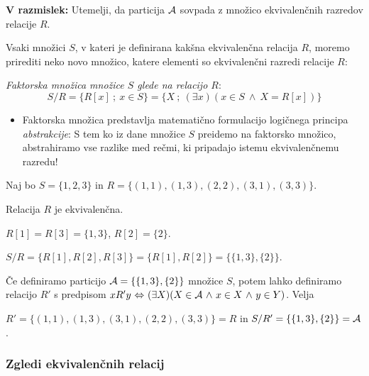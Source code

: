 \documentclass[11pt,paper=b5,footinclude,headinclude]{scrbook} %
\newcounter{example}
\def\inn {{~\wedge~}}
\def\cee {{~\Leftrightarrow~}}
\begin{document}
\textbf{ V razmislek:} Utemelji, da particija ${\cal A}$ sovpada z množico ekvivalenčnih razredov relacije $R$.

%
%
%
%

%
%
%
%
%
%
%
%
\medskip



Vsaki množici $S$, v kateri je definirana kakšna ekvivalenčna relacija $R$, moremo prirediti neko novo množico, katere elementi so ekvivalenčni razredi relacije $R$:

{\em Faktorska množica množice $S$ glede na relacijo $R$}:
$$S/R = \{R[x]~;~x\in S\}=\{X~;~(\exists x)(x\in S \inn X = R[x])\}$$
\begin{itemize}
  \item Faktorska množica predstavlja matematično formulacijo logičnega principa {\em abstrakcije}: S tem ko iz dane množice $S$ preidemo na faktorsko množico, abstrahiramo vse razlike med rečmi, ki pripadajo istemu ekvivalenčnemu razredu!
\end{itemize}


\bigskip
\begin{example*}

Naj bo $S = \{1,2,3\}$ in $R = \{(1,1),(1,3),(2,2),(3,1),(3,3)\}$.

Relacija $R$ je ekvivalenčna.

$R[1] = R[3] = \{1,3\}$, $R[2] = \{2\}$.

$S/R =  \{R[1], R[2],R[3]\} = \{R[1], R[2]\} = \{\{1,3\},\{2\}\}$.

\v Ce definiramo particijo ${\cal A} = \{\{1,3\},\{2\}\}$ množice $S$, potem lahko definiramo relacijo $R'$ s predpisom
$xR'y \cee (\exists X)(X\in {\cal A}\inn x\in X\inn y\in Y)$.
Velja

$R' = \{(1,1),(1,3),(3,1),(2,2),(3,3)\} = R$
in $S/R' = \{\{1,3\},\{2\}\} = {\cal A}$.
\end{example*}


\subsubsection*{Zgledi ekvivalenčnih relacij}
\end{document}
